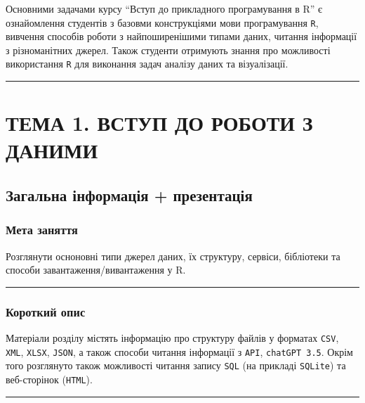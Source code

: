 \documentclass[
  letterpaper,
  DIV=11,
  numbers=noendperiod]{scrreprt}
\begin{document}
Основними задачами курсу ``Вступ до прикладного програмування в R'' є
ознайомлення студентів з базовми конструкціями мови програмування
\texttt{R}, вивчення способів роботи з найпоширенішими типами даних,
читання інформації з різноманітних джерел. Також студенти отримують
знання про можливості використання \texttt{R} для виконання задач
аналізу даних та візуалізації.

\begin{center}\rule{0.5\linewidth}{0.5pt}\end{center}

\part{ТЕМА 1. ВСТУП ДО РОБОТИ З ДАНИМИ}

\chapter{Загальна інформація +
презентація}\label{ux437ux430ux433ux430ux43bux44cux43dux430-ux456ux43dux444ux43eux440ux43cux430ux446ux456ux44f-ux43fux440ux435ux437ux435ux43dux442ux430ux446ux456ux44f}

\section{Мета
заняття}\label{ux43cux435ux442ux430-ux437ux430ux43dux44fux442ux442ux44f}

Розглянути осноновні типи джерел даних, їх структуру, сервіси,
бібліотеки та способи завантаження/вивантаження у R.

\begin{center}\rule{0.5\linewidth}{0.5pt}\end{center}

\section{Короткий
опис}\label{ux43aux43eux440ux43eux442ux43aux438ux439-ux43eux43fux438ux441}

Матеріали розділу містять інформацію про структуру файлів у форматах
\texttt{CSV}, \texttt{XML}, \texttt{XLSX}, \texttt{JSON}, а також
способи читання інформації з \texttt{API}, \texttt{chatGPT\ 3.5}. Окрім
того розглянуто також можливості читання запису \texttt{SQL} (на
прикладі \texttt{SQLite}) та веб-сторінок (\texttt{HTML}).

\begin{center}\rule{0.5\linewidth}{0.5pt}\end{center}
\end{document}
